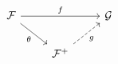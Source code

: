 \documentclass{standalone}
\begin{document}
$\displaystyle  \begin{tikzcd} \mathcal{F} \arrow{rr}{f} \arrow[swap]{dr}{\theta} && \mathcal{G} \\ & \mathcal{F}^+ \arrow[swap,dashed]{ur}{g} & \end{tikzcd} $
\end{document}
